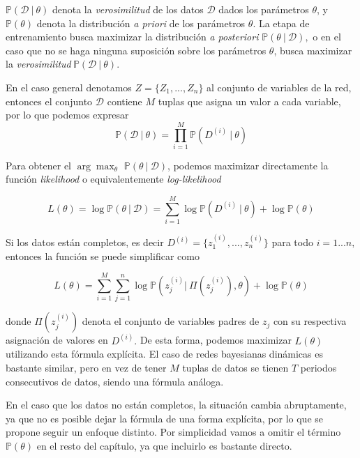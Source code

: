 $\mathbb{P}(\mathcal{D}\ |\ \theta )$ denota la \emph{verosimilitud} de los datos $\mathcal{D}$ dados los parámetros $\theta $, y $\mathbb{P}(\theta)$ denota la distribución \emph{a priori} de los parámetros $\theta
. $ La etapa de entrenamiento busca maximizar la distribución \emph{a posteriori} $\mathbb{P}(\theta \ |\ \mathcal{D}),$ o en el caso que no se haga ninguna suposición sobre los parámetros $\theta $, busca
maximizar la \emph{verosimilitud}$\mathbb{\ P}(\mathcal{D}\ |\ \theta ).$

En el caso general denotamos $Z=\{Z_{1},...,Z_{n}\}$ al conjunto de variables de la red, entonces el conjunto $\mathcal{D}$ contiene $M$ tuplas que asigna un valor a cada variable, por lo que podemos expresar
\begin{equation*}
\mathbb{P}(\mathcal{D}\ |\ \theta )=\prod\limits_{i=1}^{M}\mathbb{P}%
(D^{(i)}\ |\ \theta )
\end{equation*}

Para obtener el $\arg \max_{\theta }$ $\mathbb{P}(\theta \ |\ \mathcal{D})$, podemos maximizar directamente la función \emph{likelihood} o equivalentemente \emph{log-likelihood}

\begin{equation*}
L(\theta )=\log \mathbb{P}(\theta \ |\ \mathcal{D})=\sum_{i=1}^{M}\log 
\mathbb{P}(D^{(i)}\ |\ \theta )+\log \mathbb{P}(\theta )
\end{equation*}

Si los datos están completos, es decir $D^{(i)}=\{z_{1}^{(i)},...,z_{n}^{(i)}\}$ para todo $i=1...n,$ entonces la función se puede simplificar como

\begin{equation*}
L(\theta )=\sum_{i=1}^{M}\sum_{j=1}^{n}\log \mathbb{P}(z_{j}^{(i)}|\ \Pi
(z_{j}^{(i)}),\theta )+\log \mathbb{P}(\theta )
\end{equation*}

donde $\Pi (z_{j}^{(i)})$ denota el conjunto de variables padres de $z_{j}$ con su respectiva asignación de valores en $D^{(i)}.$ De esta forma, podemos maximizar $L(\theta )$ utilizando esta fórmula explícita. El caso de redes bayesianas dinámicas es bastante similar, pero en vez de tener $M$ tuplas de datos se tienen $T$ periodos consecutivos de datos, siendo una fórmula análoga.

En el caso que los datos no están completos, la situación cambia abruptamente, ya que no es posible dejar la fórmula de una forma explícita, por lo que se propone seguir un enfoque distinto. Por simplicidad vamos a omitir el término $\mathbb{P}(\theta )$ en el resto del capítulo, ya que incluirlo es bastante directo.



